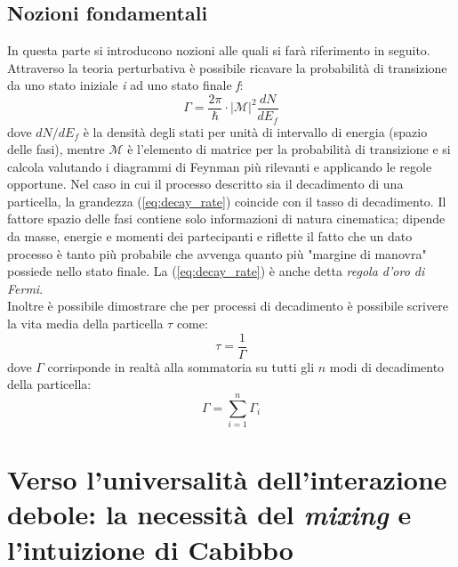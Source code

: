\documentclass{subnucbo}
\begin{document}
\subsection{Nozioni fondamentali}
In questa parte si introducono nozioni alle quali si farà riferimento in seguito.\\
Attraverso la teoria perturbativa è possibile ricavare la probabilità di transizione da uno stato iniziale \textit{i} ad uno stato finale \textit{f}:
\begin{equation}
        \Gamma = \frac{2 \pi} {\hbar} \cdot | \mathcal{M}|^{2} \frac{dN}{dE_{f}}
        \label{eq:decay_rate}
\end{equation}
dove $dN/dE_{f}$ è la densità degli stati per unità di intervallo di energia (spazio delle fasi), mentre $\mathcal{M}$ è l'elemento di matrice per la probabilità di transizione e si calcola valutando i diagrammi di Feynman più rilevanti e applicando le regole opportune. Nel caso in cui il processo descritto sia il decadimento di una particella, la grandezza (\ref{eq:decay_rate}) coincide con il tasso di decadimento. Il fattore spazio delle fasi contiene solo informazioni di natura cinematica; dipende da masse, energie e momenti dei partecipanti e riflette il fatto che un dato processo è tanto più probabile che avvenga quanto più "margine di manovra" possiede nello stato finale. La (\ref{eq:decay_rate}) è anche detta \textit{regola d'oro di Fermi}. \\
Inoltre è possibile dimostrare \cite{ref:griff} che per processi di decadimento è possibile scrivere la vita media della particella $\tau$ come:
\begin{equation}
        \tau = \frac{1}{\Gamma}
        \label{eq:tau}
\end{equation}
dove $\Gamma$ corrisponde in realtà alla sommatoria su tutti gli $n$ modi di decadimento della particella:
\begin{equation}
        \Gamma = \sum _ { i = 1 } ^ { n } \Gamma _ { i }
        \label{eq:gamma_sum}
\end{equation}

\section{Verso l'universalità dell'interazione debole: la necessità del \textit{mixing} e l'intuizione di Cabibbo}
\end{document}
